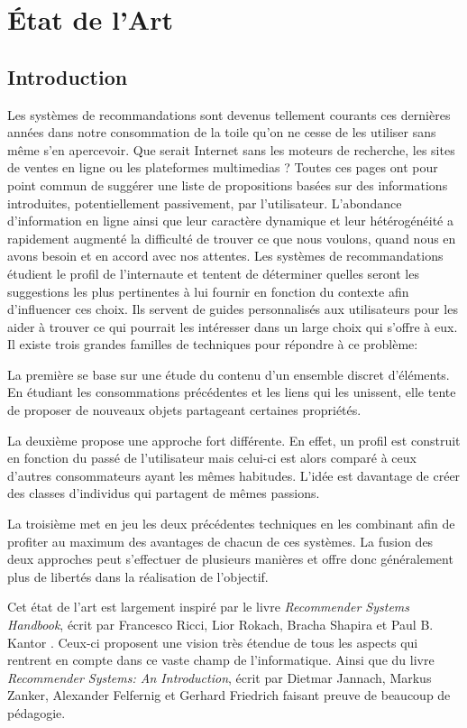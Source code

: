 \chapter{État de l'Art}

\section{Introduction}

Les systèmes de recommandations sont devenus tellement courants ces dernières années dans notre consommation de la toile qu'on ne cesse de les utiliser sans même s'en apercevoir. Que serait Internet sans les moteurs de recherche, les sites de ventes en ligne ou les plateformes multimedias ? Toutes ces pages ont pour point commun de suggérer une liste de propositions basées sur des informations introduites, potentiellement passivement, par l'utilisateur. L'abondance d'information en ligne ainsi que leur caractère dynamique et leur hétérogénéité a rapidement augmenté la difficulté de trouver ce que nous voulons, quand nous en avons besoin et en accord avec nos attentes. Les systèmes de recommandations étudient le profil de l'internaute et tentent de déterminer quelles seront les suggestions les plus pertinentes à lui fournir en fonction du contexte afin d'influencer ces choix. Ils servent de guides personnalisés aux utilisateurs pour les aider à trouver ce qui pourrait les intéresser dans un large choix qui s'offre à eux. Il existe trois grandes familles de techniques pour répondre à ce problème:

La première se base sur une étude du contenu d'un ensemble discret d'éléments. En étudiant les consommations précédentes et les liens qui les unissent, elle tente de proposer de nouveaux objets partageant certaines propriétés.

La deuxième propose une approche fort différente. En effet, un profil est construit en fonction du passé de l'utilisateur mais celui-ci est alors comparé à ceux d'autres consommateurs ayant les mêmes habitudes. L'idée est davantage de créer des classes d'individus qui partagent de mêmes passions.

La troisième met en jeu les deux précédentes techniques en les combinant afin de profiter au maximum des avantages de chacun de ces systèmes. La fusion des deux approches peut s'effectuer de plusieurs manières et offre donc généralement plus de libertés dans la réalisation de l'objectif.

Cet état de l'art est largement inspiré par le livre \textit{Recommender Systems Handbook}, écrit par Francesco Ricci, Lior Rokach, Bracha Shapira et Paul B. Kantor \cite{Ricci210}. Ceux-ci proposent une vision très étendue de tous les aspects qui rentrent en compte dans ce vaste champ de l'informatique. Ainsi que du livre \textit{Recommender Systems: An Introduction}, écrit par Dietmar Jannach, Markus Zanker, Alexander Felfernig et Gerhard Friedrich \cite{jannach2010recommender} faisant preuve de beaucoup de pédagogie.

